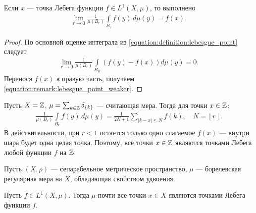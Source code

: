 
\begin{remrk}
 Если $x$ --- точка Лебега функции $f \in L^{1}(X,\mu)$, то выполнено
 \begin{align}
  \label{equation:remark:lebesgue_point_weaker}
  \lim_{r \to 0} \frac{1}{\mu(B_r)} \int\limits_{B_r} f(y) \, d\mu(y) = f(x)
 .\end{align} 
\end{remrk}
\begin{proof}
 По основной оценке интеграла из \eqref{equation:definition:lebesgue_point} следует
 \begin{align*}
  \lim_{r \to 0} \frac{1}{\mu(B_r)} \int\limits_{B_R} (f(y) - f(x)) d\mu(y) = 0
 .\end{align*} Перенося $f(x)$ в правую часть, получаем \eqref{equation:remark:lebesgue_point_weaker}.
\end{proof}

\begin{exmpl}
 Пусть $X = \mathbb{Z}$, $\mu = \sum_{k \in \mathbb{Z}} \delta_{\left\{ k \right\}}$ --- считающая мера. Тогда для точки $x \in \mathbb{Z}$:
 \begin{align*}
  \frac{1}{\mu(B_r)} \int\limits_{B_r} f(y) \, d\mu  (y) = \frac{1}{2N + 1} \sum_{\left| k - x \right| \leqslant N} f(k), \quad N = \left\lfloor r \right\rfloor 
 .\end{align*} В действительности, при $r < 1$ остается только одно слагаемое $f(x)$ --- внутри шара будет одна целая точка. Поэтому, все точки $x \in \mathbb{Z}$ являются точками Лебега любой функции $f$ на $\mathbb{Z}$.
\end{exmpl}

\begin{thm}[%
 ]
 \label{theorem:almost_all_points_are_lebesgue_points}
 Пусть $(X, \rho)$ --- сепарабельное метрическое пространство, $\mu$ --- борелевская регулярная мера на $X$, обладающая свойством удвоения.

 Пусть $f \in L^{1}(X,\mu)$. Тогда $\mu$-почти все точки $x \in X$ являются точками Лебега функции $f$.
\end{thm}

